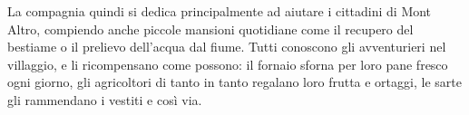 La compagnia quindi si dedica principalmente ad aiutare i cittadini di
Mont Altro, compiendo anche piccole mansioni quotidiane come il recupero
del bestiame o il prelievo dell'acqua dal fiume. Tutti conoscono gli
avventurieri nel villaggio, e li ricompensano come possono: il fornaio
sforna per loro pane fresco ogni giorno, gli agricoltori di tanto in
tanto regalano loro frutta e ortaggi, le sarte gli rammendano i vestiti
e così via.
